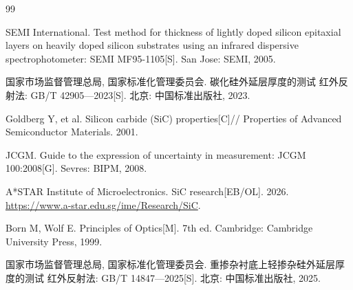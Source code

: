 \begin{thebibliography}{99}

 SEMI International. Test method for thickness of lightly doped silicon epitaxial layers on heavily doped silicon substrates using an infrared dispersive spectrophotometer: SEMI MF95-1105[S]. San Jose: SEMI, 2005.

 国家市场监督管理总局, 国家标准化管理委员会. 碳化硅外延层厚度的测试 红外反射法: GB/T 42905—2023[S]. 北京: 中国标准出版社, 2023.

 Goldberg Y, et al. Silicon carbide (SiC) properties[C]// Properties of Advanced Semiconductor Materials. 2001.

 JCGM. Guide to the expression of uncertainty in measurement: JCGM 100:2008[G]. Sevres: BIPM, 2008.

 A*STAR Institute of Microelectronics. SiC research[EB/OL]. 2026. \url{https://www.a-star.edu.sg/ime/Research/SiC}.

 Born M, Wolf E. Principles of Optics[M]. 7th ed. Cambridge: Cambridge University Press, 1999.

 国家市场监督管理总局, 国家标准化管理委员会. 重掺杂衬底上轻掺杂硅外延层厚度的测试 红外反射法: GB/T 14847—2025[S]. 北京: 中国标准出版社, 2025.

\end{thebibliography}